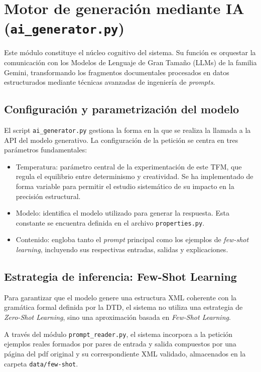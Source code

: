 \section{Motor de generación mediante IA (\texttt{ai\_generator.py})}

Este módulo constituye el núcleo cognitivo del sistema. Su función es orquestar la comunicación con los Modelos de Lenguaje de Gran Tamaño (LLMs) de la familia Gemini, transformando los fragmentos documentales procesados en datos estructurados mediante técnicas avanzadas de ingeniería de \textit{prompts}.

\subsection{Configuración y parametrización del modelo}

El script \texttt{ai\_generator.py} gestiona la forma en la que se realiza la llamada a la API del modelo generativo. La configuración de la petición se centra en tres parámetros fundamentales:

\begin{itemize}
    \item Temperatura: parámetro central de la experimentación de este TFM, que regula el equilibrio entre determinismo y creatividad. Se ha implementado de forma variable para permitir el estudio sistemático de su impacto en la precisión estructural.

    \item Modelo: identifica el modelo utilizado para generar la respuesta. Esta constante se encuentra definida en el archivo \texttt{properties.py}.

    \item Contenido: engloba tanto el \textit{prompt} principal como los ejemplos de \textit{few-shot learning}, incluyendo sus respectivas entradas, salidas y explicaciones.
\end{itemize}

\subsection{Estrategia de inferencia: Few-Shot Learning}

Para garantizar que el modelo genere una estructura XML coherente con la gramática formal definida por la DTD, el sistema no utiliza una estrategia de \textit{Zero-Shot Learning}, sino una aproximación basada en \textit{Few-Shot Learning}.

A través del módulo \texttt{prompt\_reader.py}, el sistema incorpora a la petición ejemplos reales formados por pares de entrada y salida compuestos por una página del pdf original y su correspondiente XML validado, almacenados en la carpeta \texttt{data/few-shot}.

